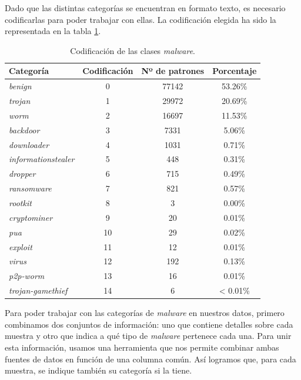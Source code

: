 Dado que las distintas categorías se encuentran en formato texto, es necesario codificarlas para poder trabajar con ellas. La codificación elegida ha sido la representada en la tabla \ref{tabla:codificacion_malware}.

\vspace{1em}

\begin{table}[th]
	\centering
	\begin{tabular}{ |m{4cm}|c|c|c| }
		\hline
		\rowcolor{LightCyan}
		Categoría                   & Codificación & Nº de patrones & Porcentaje \\
		\hline
		\textit{benign}             & 0  & 77142 & 53.26\%  \\
		\textit{trojan}             & 1  & 29972 & 20.69\%  \\
		\textit{worm}               & 2  & 16697 & 11.53\%  \\
		\textit{backdoor}           & 3  & 7331  & 5.06\%   \\
		\textit{downloader}         & 4  & 1031  & 0.71\%   \\
		\textit{informationstealer} & 5  & 448   & 0.31\%   \\
		\textit{dropper}            & 6  & 715   & 0.49\%   \\
		\textit{ransomware}         & 7  & 821   & 0.57\%   \\
		\textit{rootkit}            & 8  & 3     & 0.00\%   \\
		\textit{cryptominer}        & 9  & 20    & 0.01\%   \\
		\textit{pua}                & 10 & 29    & 0.02\%   \\
		\textit{exploit}            & 11 & 12    & 0.01\%   \\
		\textit{virus}              & 12 & 192   & 0.13\%   \\
		\textit{p2p-worm}           & 13 & 16    & 0.01\%   \\
		\textit{trojan-gamethief}   & 14 & 6     & < 0.01\% \\
		\hline
	\end{tabular}
	\caption{Codificación de las clases \textit{malware}.}
	\label{tabla:codificacion_malware}
\end{table}

\newpage
Para poder trabajar con las categorías de \textit{malware} en nuestros datos, primero combinamos dos conjuntos de información: uno que contiene detalles sobre cada muestra y otro que indica a qué tipo de \textit{malware} pertenece cada una. Para unir esta información, usamos una herramienta que nos permite combinar ambas fuentes de datos en función de una columna común. Así logramos que, para cada muestra, se indique también su categoría si la tiene.

